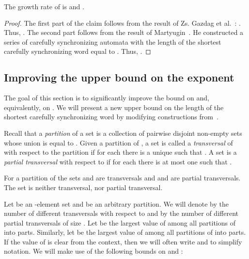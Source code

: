 \documentclass[a4paper,USenglish]{lipics}
\theoremstyle{definition}
\begin{document}
\begin{corollary}
\label{corr:simpleBounds}
The growth rate of  is  and .
\end{corollary}
\begin{proof}
The first part of the claim follows from the result of Zs. Gazdag et al.~\cite[Theorem 3]{Ivan2009}: 
. Thus, .
The second part follows from the result of Martyugin~\cite{Mart2010}. He constructed a series of carefully synchronizing automata with the length of the shortest carefully synchronizing word equal to . Thus, .
\end{proof}


\subsection{Improving the upper bound on the exponent}
\label{sec:imprupper}

The goal of this section is to significantly improve the bound on  and, equivalently, on . 
We will present a new upper bound on the length of the shortest carefully synchronizing word by modifying constructions from~\cite{Ivan2009}. 


Recall that a \emph{partition} of a set  is a collection  of pairwise disjoint non-empty sets whose union is equal to . Given a partition  of , a set  is called a {\it transversal} of  with respect to the partition  if for each  there is a unique  such that .
A set  is a {\it partial transversal} with respect to  if for each  there is at most one  such that .

\begin{example}
For a partition  of  the sets  and  are transversals and  and  are partial transversals. The set  is neither transversal, nor partial transversal.
\end{example}
Let  be an -element set and  be an arbitrary partition. We will denote by  the number of different transversals with respect to  and by  the number of different partial transversals of size .
Let  be the largest value of  among all partitions  of  into  parts. Similarly, let  be the largest value of  among all partitions  of  into  parts. If the value of  is clear from the context, then we will often write  and  to simplify notation.
We will make use of the following bounds on  and :
\end{document}
